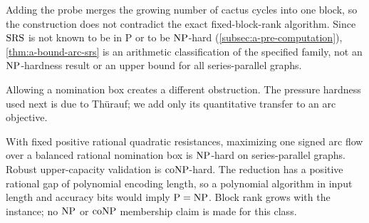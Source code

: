 Adding the probe merges the growing number of cactus cycles into one
block, so the construction does not contradict the exact
fixed-block-rank algorithm. Since $\mathrm{SRS}$ is not known to be in P or
to be $\mathrm{NP}$-hard (\cref{subsec:a-pre-computation}),
\cref{thm:a-bound-arc-srs} is an arithmetic classification of the
specified family, not an $\mathrm{NP}$-hardness result or an upper bound for
all series-parallel graphs.

Allowing a nomination box creates a different obstruction. The pressure
hardness used next is due to Th\"urauf; we add only its quantitative
transfer to an arc objective.

\begin{theorem}
\label{thm:a-bound-nomination}
With fixed positive rational quadratic resistances, maximizing one
signed arc flow over a balanced rational nomination box is $\mathrm{NP}$-hard
on series-parallel graphs. Robust upper-capacity validation is
$\mathrm{coNP}$-hard. The reduction has a positive rational gap of polynomial
encoding length, so a polynomial algorithm in input length and accuracy
bits would imply $\mathrm P=\mathrm{NP}$. Block rank grows with the instance;
no $\mathrm{NP}$ or $\mathrm{coNP}$ membership claim is made for this class.
\end{theorem}
